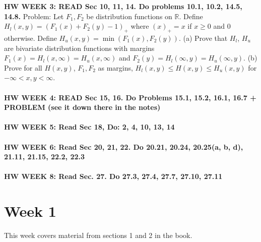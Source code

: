 \documentclass[12pt]{article}
\begin{document}
{\bf HW WEEK 3: READ Sec 10, 11, 14.  Do problems 10.1, 10.2, 14.5, 14.8.}
Problem: Let $F_1, F_2$ be distribution functions on $\mathbb{R}$.  Define $H_l(x,y) = (F_1(x) + F_2(y) - 1)_+$ where $(x)_+ = x$ if $x \ge 0$ and $0$ otherwise.  Define $H_u(x,y) = \min(F_1(x), F_2(y))$.  (a) Prove that $H_l$, $H_u$ are bivariate distribution functions with margins $F_1(x) = H_l(x, \infty) = H_u(x, \infty)$ and $F_2(y) = H_l(\infty, y) = H_u(\infty, y)$. (b) Prove for all $H(x,y)$, $F_1, F_2$ as margins, $H_l(x,y) \le H(x,y) \le H_u(x,y)$ for $-\infty < x,y < \infty$.
\\ \\
{\bf HW WEEK 4: READ Sec 15, 16.  Do Problems 15.1, 15.2, 16.1, 16.7 + PROBLEM (see it down there in the notes)}
\\ \\
{\bf HW WEEK 5: Read Sec 18, Do: 2, 4, 10, 13, 14}
\\ \\
{\bf HW WEEK 6: Read Sec 20, 21, 22.  Do 20.21, 20.24, 20.25(a, b, d), 21.11, 21.15, 22.2, 22.3}
\\ \\
{\bf HW WEEK 8: Read Sec. 27.  Do 27.3, 27.4, 27.7, 27.10, 27.11}


\section{Week 1}
This week covers material from sections 1 and 2 in the book.
\end{document}
